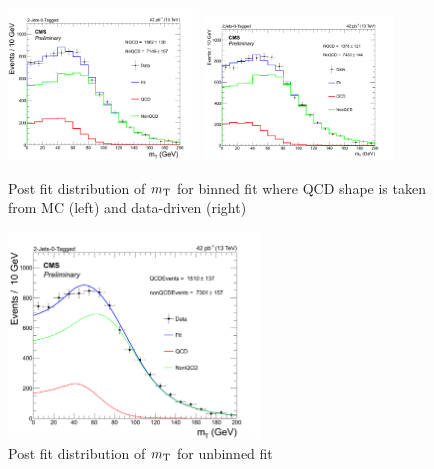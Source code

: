 \begin{figure}[hbpt]
\begin{center}
\includegraphics[width=0.45\textwidth]{figures/2J0T/Sep8/BinnedFit_QCD_MC.png}
\includegraphics[width=0.45\textwidth]{figures/2J0T/Sep8/BinnedFit_QCD_DD.png}\hfill
\caption{\label{fig:qcdFit1}Post fit distribution of $m_{\mathrm{\rm T}}$ for binned fit where QCD shape is taken from MC (left) and data-driven (right) }
\end{center}
\end{figure}

\begin{figure}[hbpt]
\begin{center}
\includegraphics[width=0.6\textwidth]{figures/2J0T/Sep8/UnbinnedFit_QCD.png}
\caption{\label{fig:qcdFit2}Post fit distribution of $m_{\mathrm{\rm T}}$ for unbinned fit}
\end{center}
\end{figure}




